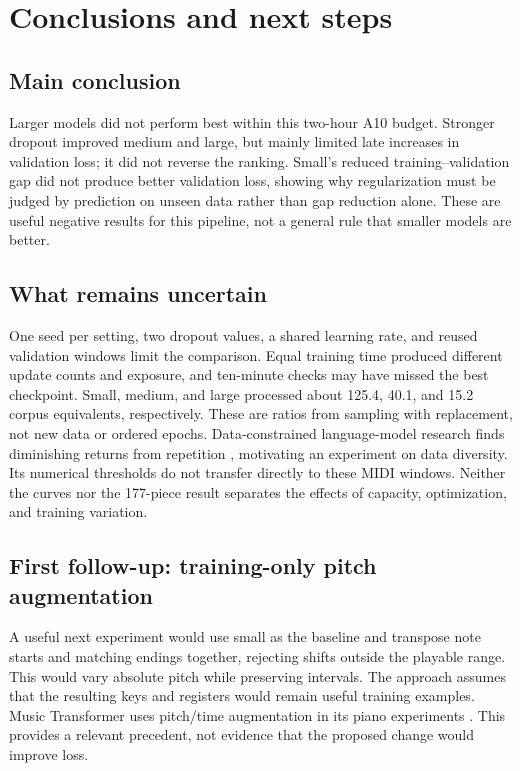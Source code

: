 \section{Conclusions and next steps}
\label{sec:conclusions}
\subsection*{Main conclusion}
Larger models did not perform best within this two-hour A10 budget. Stronger dropout improved medium and large, but mainly limited late increases in validation loss; it did not reverse the ranking. Small's reduced training--validation gap did not produce better validation loss, showing why regularization must be judged by prediction on unseen data rather than gap reduction alone. These are useful negative results for this pipeline, not a general rule that smaller models are better.

\subsection*{What remains uncertain}
One seed per setting, two dropout values, a shared learning rate, and reused validation windows limit the comparison. Equal training time produced different update counts and exposure, and ten-minute checks may have missed the best checkpoint. Small, medium, and large processed about 125.4, 40.1, and 15.2 corpus equivalents, respectively. These are ratios from sampling with replacement, not new data or ordered epochs. Data-constrained language-model research finds diminishing returns from repetition \citep{muennighoff2023data}, motivating an experiment on data diversity. Its numerical thresholds do not transfer directly to these MIDI windows. Neither the curves nor the 177-piece result separates the effects of capacity, optimization, and training variation.

\subsection*{First follow-up: training-only pitch augmentation}
A useful next experiment would use small as the baseline and transpose note starts and matching endings together, rejecting shifts outside the playable range. This would vary absolute pitch while preserving intervals. The approach assumes that the resulting keys and registers would remain useful training examples. Music Transformer uses pitch/time augmentation in its piano experiments \citep[Section~4.2]{huang2019musictransformer}. This provides a relevant precedent, not evidence that the proposed change would improve loss.

